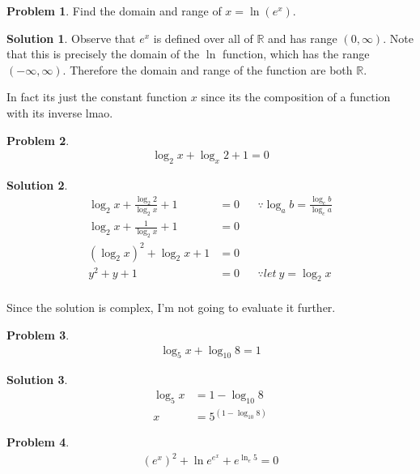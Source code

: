 \documentclass[a4paper]{article}
\theoremstyle{definition}
\newtheorem{problem}{Problem}[section]
\newtheorem*{solution}{Solution}
\begin{document}
\begin{problem}
Find the domain and range of \(x = \ln(e^x)\).
\end{problem}

\begin{solution}
Observe that \(e^x\) is defined over all of \(\mathbb{R}\) and has range \((0, \infty)\). Note that this is precisely the domain of the \(\ln\) function, which has the range \((-\infty, \infty)\). Therefore the domain and range of the function are both \(\mathbb{R}\).

In fact its just the constant function \(x\) since its the composition of a function with its inverse lmao.
\end{solution}

\begin{problem}
\begin{align*}
\log_2 x + \log_x 2 +1 = 0
\end{align*}
\end{problem}

\begin{solution}
\begin{align*}
\log_2 x + \frac{\log_2 2}{\log_2 x} +1 &=0 && \because \log_ab = \frac{\log_c b}{\log_c a} \\
\log_2 x + \frac{1}{\log_2x} +1 &= 0 \\
(\log_2x)^2 + \log_2 x+ 1 &= 0 \\
y^2 + y + 1 &=0 && \because let\ y =\log_2 x \\
\end{align*}

Since the solution is complex, I'm not going to evaluate it further.
\end{solution}

\begin{problem}
\begin{align*}
\log_5 x+ \log_{10}8 = 1
\end{align*}
\end{problem}

\begin{solution}
\begin{align*}
\log_5x &= 1- \log_{10}8 \\
x &= 5^{(1-\log_{10} 8)}
\end{align*}
\end{solution}

\begin{problem}
\begin{align*}
(e^x)^2 + \ln e^{e^x} + e^{\ln_e 5} = 0
\end{align*}
\end{problem}
\end{document}

